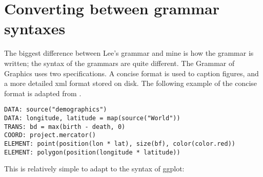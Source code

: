 \section{Converting between grammar syntaxes}

The biggest difference between Lee's grammar and mine is how the grammar is written; the syntax of the grammars are quite different.  The Grammar of Graphics uses two specifications.  A concise format is used to caption figures, and a more detailed xml format stored on disk.  The following example of the concise format is adapted from \citet[][Figure 1.5, page 13]{wilkinson:2006}.

\begin{verbatim}
DATA: source("demographics")
DATA: longitude, latitude = map(source("World"))
TRANS: bd = max(birth - death, 0)
COORD: project.mercator()
ELEMENT: point(position(lon * lat), size(bf), color(color.red))
ELEMENT: polygon(position(longitude * latitude))
\end{verbatim}

This is relatively simple to adapt to the syntax of ggplot:

